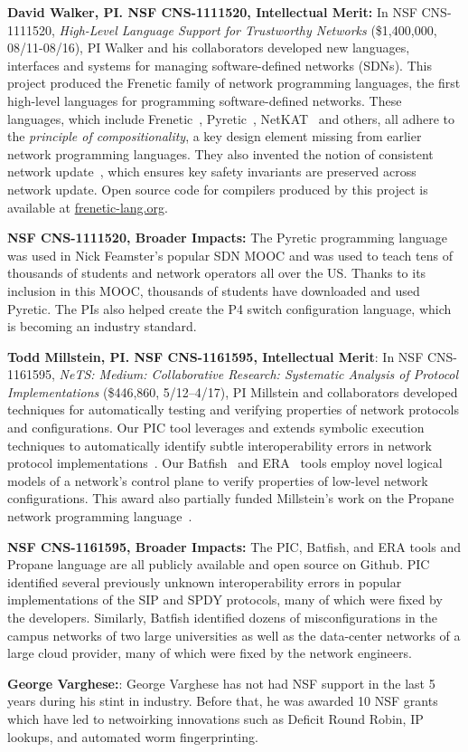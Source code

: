 \noindent
{\bf David Walker, PI. NSF CNS-1111520, Intellectual Merit:}
In NSF CNS-1111520, \emph{High-Level Language Support for Trustworthy Networks}
(\$1,400,000, 08/11-08/16),
PI Walker and his collaborators developed new languages, interfaces
and systems for managing software-defined networks (SDNs).  
This project produced the Frenetic family
of network programming languages, the first high-level languages for
programming software-defined networks.  These languages, which include
Frenetic~\cite{frenetic}, 
Pyretic~\cite{pyretic},
NetKAT~\cite{netkat} and others, all adhere to the
\emph{principle of compositionality}, a key design element missing
from earlier network programming languages.  They also invented the
notion of consistent network update~\cite{reitblatt+:consistent-updates},
which ensures key safety invariants are preserved across network update.
Open source code for compilers produced by this project is available
at \url{frenetic-lang.org}.

\noindent
{\bf NSF CNS-1111520, Broader Impacts:} 
The Pyretic programming language was used in Nick Feamster's popular
SDN MOOC and was used to teach tens of thousands of students and
network operators all over the US.  Thanks to its inclusion in this
MOOC, thousands of students have downloaded and used Pyretic.  The PIs
also helped create the P4 switch configuration language, which is
becoming an industry standard.

\medskip
\noindent
{\bf Todd Millstein, PI. NSF CNS-1161595, Intellectual Merit}: In NSF CNS-1161595, {\em NeTS: Medium: Collaborative Research: Systematic Analysis of Protocol Implementations} (\$446,860, 5/12--4/17), PI Millstein and collaborators developed techniques for automatically testing and verifying properties of network protocols and configurations.  Our PIC tool leverages and extends symbolic execution techniques to automatically identify subtle interoperability errors in network protocol implementations~\cite{DBLP:conf/nsdi/PedrosaFKGMM15}.  Our Batfish~\cite{batfish} and ERA~\cite{era} tools employ novel logical models of a network's control plane to verify properties of low-level network configurations.  This award also partially funded Millstein's work on the Propane network programming language~\cite{beckett+:propane}. 

\noindent
{\bf NSF CNS-1161595, Broader Impacts:} The PIC, Batfish, and ERA tools and Propane language are all publicly available and open source on Github.  PIC identified several previously unknown interoperability errors in popular implementations of the SIP and SPDY protocols, many of which were fixed by the developers.  Similarly, Batfish identified dozens of misconfigurations in the campus networks of two large universities as well as the data-center networks of a large cloud provider, many of which were fixed by the network engineers.

{\bf George Varghese:}: George Varghese has not had NSF support in the last 5 years during his stint in industry.  Before that, he was awarded 10 NSF grants which have led to netwoirking innovations such as Deficit Round Robin, IP lookups, and automated worm fingerprinting.


